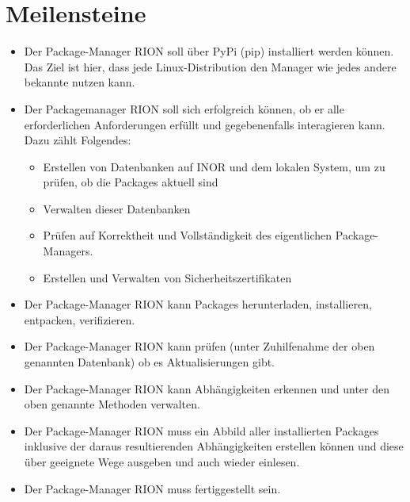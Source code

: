 \section{Meilensteine}

\begin{itemize}
	\item
		Der Package-Manager RION soll über PyPi (pip) installiert werden können. Das Ziel ist hier, dass jede Linux-Distribution den Manager wie jedes andere bekannte  nutzen kann.

	\item Der Packagemanager RION soll sich erfolgreich  können, ob er alle erforderlichen Anforderungen erfüllt und gegebenenfalls interagieren kann. Dazu zählt Folgendes:

		\begin{itemize}
			\item Erstellen von Datenbanken auf INOR und dem lokalen System, um zu prüfen, ob die Packages aktuell sind
			\item Verwalten dieser Datenbanken
			\item Prüfen auf Korrektheit und Vollständigkeit des eigentlichen Package-Managers.
			\item Erstellen und Verwalten von Sicherheitszertifikaten
		\end{itemize}
	\item Der Package-Manager RION kann Packages herunterladen, installieren, entpacken, verifizieren.
	\item Der Package-Manager RION kann prüfen (unter Zuhilfenahme der oben genannten Datenbank) ob es Aktualisierungen gibt.
	\item Der Package-Manager RION kann Abhängigkeiten erkennen und unter den oben genannte Methoden verwalten.
	\item Der Package-Manager RION muss ein Abbild aller installierten Packages inklusive der daraus resultierenden Abhängigkeiten erstellen können und diese über geeignete Wege ausgeben und auch wieder einlesen.
	\item Der Package-Manager RION muss fertiggestellt sein.
\end{itemize}
